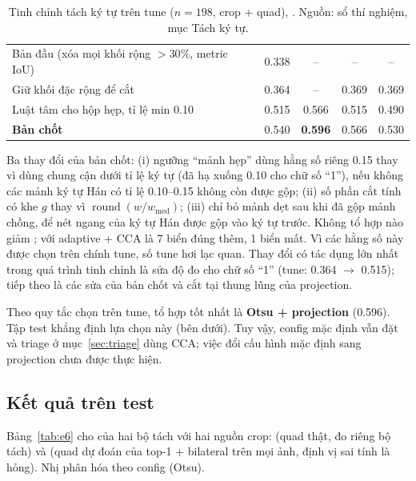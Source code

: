 \begin{table}[htbp]
\centering
\caption[Tinh chỉnh tách ký tự trên tune]{Tinh chỉnh tách ký tự trên tune ($n=198$, crop  + quad), . Nguồn: sổ thí nghiệm, mục Tách ký tự.}
\label{tab:segtune}
\small
{}
\begin{tabularx}{\textwidth}{YCCCC}
\hline
{}  &  &  &  &  \\
\hline
Bản đầu (xóa mọi khối rộng $>30\%$, metric IoU) & 0.338 & -- & -- & -- \\
Giữ khối đặc rộng để cắt & 0.364 & -- & 0.369 & 0.369 \\
Luật tâm cho hộp hẹp, tỉ lệ min 0.10 & 0.515 & 0.566 & 0.515 & 0.490 \\
\textbf{Bản chốt} & 0.540 & \textbf{0.596} & 0.566 & 0.530 \\
\hline
\end{tabularx}
\end{table}

Ba thay đổi của bản chốt: (i) ngưỡng ``mảnh hẹp'' dùng hằng số riêng 0.15 thay vì dùng chung cận dưới tỉ lệ ký tự (đã hạ xuống 0.10 cho chữ số ``1''), nếu không các mảnh ký tự Hán có tỉ lệ 0.10--0.15 không còn được gộp; (ii) số phần cắt tính có khe $g$ thay vì $\operatorname{round}(w/w_{\mathrm{med}})$; (iii) chỉ bỏ mảnh dẹt sau khi đã gộp mảnh chồng, để nét ngang của ký tự Hán được gộp vào ký tự trước. Không tổ hợp nào giảm ; với adaptive + CCA là 7 biển đúng thêm, 1 biển mất. Vì các hằng số này được chọn trên chính tune, số tune hơi lạc quan. Thay đổi có tác dụng lớn nhất trong quá trình tinh chỉnh là sửa độ đo cho chữ số ``1'' (tune: 0.364 $\to$ 0.515); tiếp theo là các sửa của bản chốt và cắt tại thung lũng của projection.

Theo quy tắc chọn trên tune, tổ hợp tốt nhất là \textbf{Otsu + projection} (0.596). Tập test khẳng định lựa chọn này (bên dưới). Tuy vậy, config mặc định vẫn đặt  và triage ở mục~\ref{sec:triage} dùng CCA; việc đổi cấu hình mặc định sang projection chưa được thực hiện.

\subsection{Kết quả trên test}
\label{sec:e6test}

Bảng~\ref{tab:e6} cho  của hai bộ tách với hai nguồn crop:  (quad thật, đo riêng bộ tách) và  (quad dự đoán của top-1  + bilateral trên mọi ảnh, định vị sai tính là hỏng). Nhị phân hóa theo config (Otsu).

